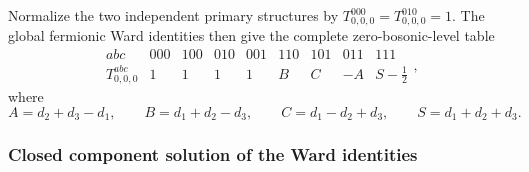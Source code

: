 \documentclass[11pt]{article}
\newcommand{\half}{\tfrac12}
\begin{document}
Normalize the two independent primary structures by
\(T_{0,0,0}^{000}=T_{0,0,0}^{010}=1\).  The global fermionic Ward identities
then give the complete zero-bosonic-level table
\begin{equation}
\begin{array}{c|cccccccc}
abc&000&100&010&001&110&101&011&111\\
\hline
T_{0,0,0}^{abc}
&1&1&1&1&B&C&-A&S-\half
\end{array},
\label{eq:primary-ward-table}
\end{equation}
where
\begin{equation}
 A=d_2+d_3-d_1,
 \qquad B=d_1+d_2-d_3,
 \qquad C=d_1-d_2+d_3,
 \qquad S=d_1+d_2+d_3.
 \label{eq:abc-combinations}
\end{equation}

\subsubsection{Closed component solution of the Ward identities}
\end{document}
